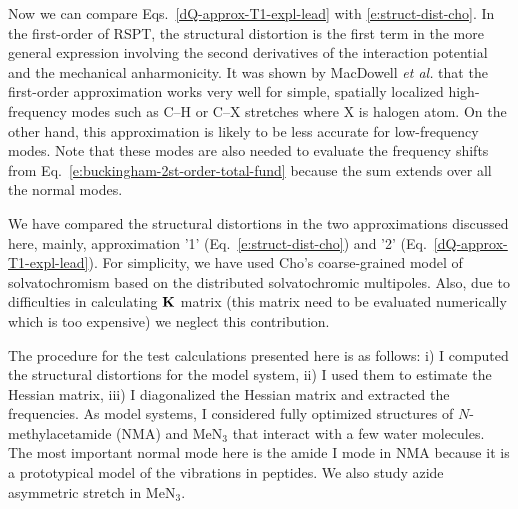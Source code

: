 \documentclass[a4paper,titlepage,twoside,fleqn,12pt]{book}
\begin{document}
\begin{refsection}
Now we can compare Eqs.~\eqref{dQ-approx-T1-expl-lead} with \eqref{e:struct-dist-cho}.
In the first\hyp{}order of RSPT, the structural distortion is the first term
in the more general expression involving the second 
derivatives of the interaction potential and the mechanical anharmonicity.
It was shown by MacDowell \emph{et al.} that the first\hyp{}order approximation works 
very well for simple, spatially localized high\hyp{}frequency modes such as
C--H or C--X stretches where X is halogen atom. On the other hand, this
approximation is likely to be less accurate for low\hyp{}frequency modes.
Note that these modes are also needed to evaluate the frequency shifts
from Eq.~\eqref{e:buckingham-2st-order-total-fund} because the sum extends over
all the normal modes.

We have compared the structural distortions in the two approximations
discussed here, mainly, approximation '1' (Eq.~\eqref{e:struct-dist-cho}) and 
'2' (Eq.~\eqref{dQ-approx-T1-expl-lead}). For simplicity, we have used Cho's coarse\hyp{}grained
model of solvatochromism based on the distributed solvatochromic multipoles. 
Also, due to difficulties in calculating $\bf K$ matrix (this matrix need to
be evaluated numerically which is too expensive) we neglect this contribution. 

The procedure for the test calculations presented here is as follows: i) 
I computed the structural distortions for the model system, ii) I used them to estimate
the Hessian matrix, iii) I diagonalized the Hessian matrix and extracted the frequencies.
As model systems, I considered fully optimized structures of $N$-methylacetamide (NMA) 
and MeN$_3$ 
that interact with a few water molecules.
The most important normal mode here is the amide I mode in NMA
because it is a prototypical model of the vibrations in peptides.
We also study azide asymmetric
stretch in MeN$_3$.


\end{refsection}
\end{document}
